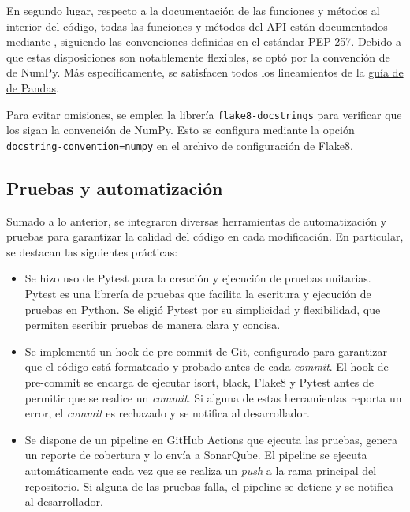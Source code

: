 En segundo lugar, respecto a la documentación de las funciones y métodos al interior del código, todas las funciones y métodos del \gls{API} están documentados mediante , siguiendo las convenciones definidas en el estándar \href{https://peps.python.org/pep-0257/}{\gls{PEP} 257}. Debido a que estas disposiciones son notablemente flexibles, se optó por la convención de  de \gls{NumPy}. Más específicamente, se satisfacen todos los lineamientos de la \href{https://python-sprints.github.io/pandas/guide/pandas_docstring.html}{guía de  de \gls{Pandas}}.

Para evitar omisiones, se emplea la librería \verb|flake8-docstrings| para verificar que los  sigan la convención de \gls{NumPy}. Esto se configura mediante la opción \verb|docstring-convention=numpy| en el archivo de configuración de \gls{Flake8}.

\subsection{Pruebas y automatización}

Sumado a lo anterior, se integraron diversas herramientas de automatización y pruebas para garantizar la calidad del código en cada modificación. En particular, se destacan las siguientes prácticas:

\begin{itemize}
	\item Se hizo uso de \gls{Pytest} para la creación y ejecución de \gls{pruebas unitarias}. \gls{Pytest} es una librería de pruebas que facilita la escritura y ejecución de pruebas en \gls{Python}. Se eligió \gls{Pytest} por su simplicidad y flexibilidad, que permiten escribir pruebas de manera clara y concisa.
	\item Se implementó un \gls{hook} de pre-commit de \gls{Git}, configurado para garantizar que el código está formateado y probado antes de cada \textit{commit}. El \gls{hook} de pre-commit se encarga de ejecutar \gls{isort}, \gls{black}, \gls{Flake8} y \gls{Pytest} antes de permitir que se realice un \textit{commit}. Si alguna de estas herramientas reporta un error, el \textit{commit} es rechazado y se notifica al desarrollador.
	\item Se dispone de un \gls{pipeline} en \gls{GitHub Actions} que ejecuta las pruebas, genera un reporte de cobertura y lo envía a \gls{SonarQube}. El \gls{pipeline} se ejecuta automáticamente cada vez que se realiza un \textit{push} a la rama principal del repositorio. Si alguna de las pruebas falla, el \gls{pipeline} se detiene y se notifica al desarrollador.
\end{itemize}

